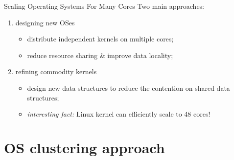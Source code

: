 \documentclass{beamer}
\begin{document}
\begin{frame}{Scaling Operating Systems For Many Cores}
  Two main approaches:
  \begin{enumerate}
    \item designing new OSes
      \begin{itemize}
        \item distribute independent kernels on multiple cores;
        \item reduce resource sharing \& improve data locality;
      \end{itemize}
    \item refining commodity kernels
      \begin{itemize}
        \item design new data structures to reduce the contention on
          shared data structures;
        \item \emph{interesting fact:} Linux kernel can efficiently scale to 48
          cores!
      \end{itemize}
  \end{enumerate}
\end{frame}

\section{OS clustering approach}
\end{document}
